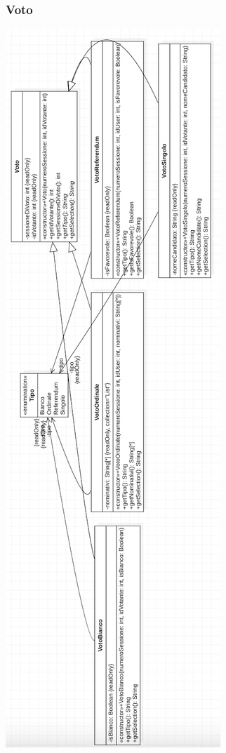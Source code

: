 \documentclass[11pt, oneside]{article}   	%
\begin{document}
\subsubsection{Voto}
\begin{center}
\includegraphics[scale=0.7]{images/class13.png}
\end{center}
\end{document}
